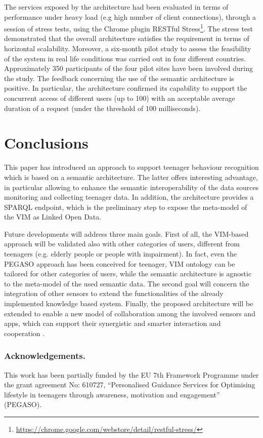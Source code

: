 \documentclass[runningheads,a4paper]{llncs}
\begin{document}
The services exposed by the architecture had been evaluated in terms of performance under  heavy load (e.g high number of client connections), through a session of  stress tests, using the Chrome plugin RESTful Stress\footnote{\url{https://chrome.google.com/webstore/detail/restful-stress/}}. The stress test demonstrated that the overall architecture satisfies the requirement in terms of horizontal scalability. Moreover, a six-month pilot study to assess the feasibility of the system in real life conditions was carried out in four different countries. Approximately 350 participants of the four pilot sites have been involved during the study. The feedback concerning the use of the semantic architecture is positive. In particular, the architecture confirmed its capability to support the concurrent access of different users (up to 100) with an acceptable average duration of a request (under the threshold of 100 milliseconds). 

\section{Conclusions}

This paper has introduced an approach to support teenager behaviour recognition which is based on a semantic architecture. The latter offers interesting advantage, in particular allowing to enhance the semantic interoperability of the data sources monitoring and collecting teenager data. In addition, the architecture provides a SPARQL endpoint, which is the preliminary step to expose the meta-model of the VIM as Linked Open Data.  

Future developments will address three main goals. First of all, the VIM-based approach will be validated also with other categories of users, different from teenagers (e.g. elderly people or people with impairment). In fact, even the PEGASO approach has been conceived for teenager, VIM ontology can be tailored for other categories of users, while the semantic architecture is agnostic to the meta-model  of the used semantic data. The second goal will concern the integration of other sensors to extend the functionalities of the already implemented knowledge based system. Finally, the proposed architecture will be extended to enable a new model of collaboration among the involved sensors and apps, which can support their synergistic and smarter interaction and cooperation  \cite{_Ref490756416}. 

\subsubsection*{Acknowledgements.}This work has been partially funded by the EU 7th Framework Programme under the grant agreement No: 610727, ``Personalised Guidance Services for Optimising lifestyle in teenagers through awareness, motivation and engagement'' (PEGASO).
\end{document}
